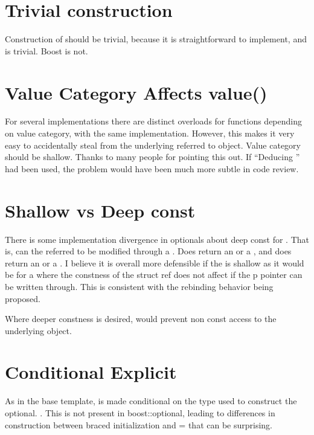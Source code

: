 \documentclass[a4paper,10pt,oneside,openany,final,article]{memoir}
\begin{document}
\section{Trivial construction}
Construction of  should be trivial, because it is straightforward to implement, and  is trivial. Boost is not.

\section{Value Category Affects value()}
For several implementations there are distinct overloads for functions depending on value category, with the same implementation. However, this makes it very easy to accidentally steal from the underlying referred to object. Value category should be shallow. Thanks to many people for pointing this out. If ``Deducing '' had been used, the problem would have been much more subtle in code review.

\section{Shallow vs Deep const}

There is some implementation divergence in optionals about deep const for . That is, can the referred to  be modified through a . Does  return an  or a , and does  return an  or a . I believe it is overall more defensible if the  is shallow as it would be for a  where the constness of the struct ref does not affect if the p pointer can be written through. This is consistent with the rebinding behavior being proposed.

Where deeper constness is desired,  would prevent non const access to the underlying object.

\section{Conditional Explicit}
As in the base template,  is made conditional on the type used to construct the optional. . This is not present in boost::optional, leading to differences in construction between braced initialization and = that can be surprising.
\end{document}
